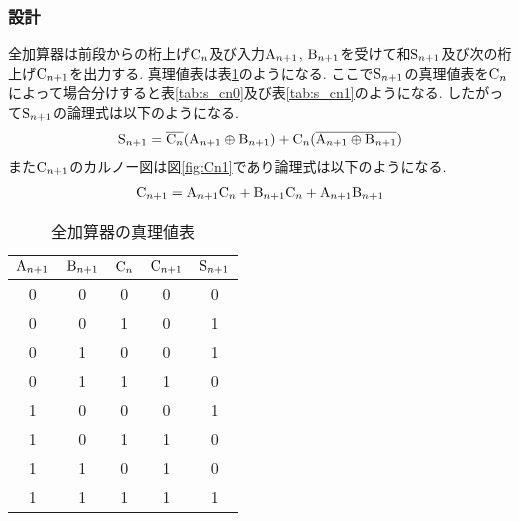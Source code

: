 \subsubsection{設計}
全加算器は前段からの桁上げ${\rm C}_n$及び入力${\rm A}_{n+1}$, ${\rm B}_{n+1}$を受けて和${\rm S}_{n+1}$及び次の桁上げ${\rm C}_{n+1}$を出力する.
真理値表は表\ref{tab:full_adder}のようになる.
ここで${\rm S}_{n+1}$の真理値表を${\rm C}_n$によって場合分けすると表\ref{tab:s_cn0}及び表\ref{tab:s_cn1}のようになる.
したがって${\rm S}_{n+1}$の論理式は以下のようになる.
\begin{align}
  {\rm S}_{n+1}=\overline{{\rm C}_n}({\rm A}_{n+1}\oplus{\rm B}_{n+1})+{\rm C}_n(\overline{{\rm A}_{n+1}\oplus{\rm B}_{n+1}})
\end{align}
また${\rm C}_{n+1}$のカルノー図は図\ref{fig:Cn1}であり論理式は以下のようになる.
\begin{align}
  {\rm C}_{n+1}={\rm A}_{n+1}{\rm C}_n+{\rm B}_{n+1}{\rm C}_n+{\rm A}_{n+1}{\rm B}_{n+1}
\end{align}
\newpage
\begin{table}[h]
  \centering
  \begin{tabular}{ccc|cc}
    \hline
    ${\rm A}_{n+1}$ & ${\rm B}_{n+1}$ & ${\rm C}_{n}$ & ${\rm C}_{n+1}$ & ${\rm S}_{n+1}$ \\
    \hline
    0 & 0 & 0 & 0 & 0 \\
    0 & 0 & 1 & 0 & 1 \\
    0 & 1 & 0 & 0 & 1 \\
    0 & 1 & 1 & 1 & 0 \\
    1 & 0 & 0 & 0 & 1 \\
    1 & 0 & 1 & 1 & 0 \\
    1 & 1 & 0 & 1 & 0 \\
    1 & 1 & 1 & 1 & 1 \\
    \hline
  \end{tabular}
  \caption{全加算器の真理値表}
  \label{tab:full_adder}
\end{table}

